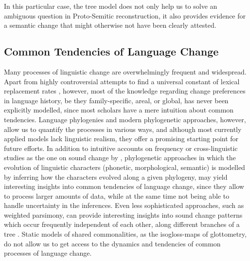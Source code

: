 \documentclass[svgnames,12pt]{scrartcl}
\begin{document}
{{In this particular case, the tree model does not only help us to solve an ambiguous question in
Proto-Semitic reconstruction, it also provides evidence for a semantic change that might otherwise
not have been clearly attested.

 
\subsection{Common Tendencies of Language Change}
Many processes of linguistic change are overwhelmingly frequent and widespread. Apart from highly
controversial attempts to find a universal constant of lexical replacement rates
\citep{Swadesh1955}, however, most of the knowledge regarding change preferences in language
history, be they family-specific, areal, or global, has never been explicitly modelled, since most
scholars have a mere intuition about common tendencies.  Language phylogenies and modern
phylogenetic approaches, however, allow us to quantify the processes in various ways, and although
most currently applied models lack linguistic realism, they offer a promising starting point for
future efforts. In addition to intuitive accounts on frequency or cross-linguistic studies as the
one on sound change by \citet{kuemmel07wandel}, phylogenetic approaches in which the evolution of
linguistic characters (phonetic, morphological, semantic) is modelled by inferring how the
characters evolved along a given phylogeny, may yield interesting insights into common tendencies of
language change, since they allow to process larger amounts of data, while at the same time not
being able to handle uncertainty in the inferences. Even less sophisticated approaches, such as
weighted parsimony, can provide interesting insights into sound change patterns which occur
frequently independent of each other, along different branches of a tree \citep{Chacon2015a}. Static
models of shared commonalities, as the isogloss-maps of glottometry, do not allow us to get access
to the dynamics and tendencies of common processes of language change.
 
}}
\end{document}
